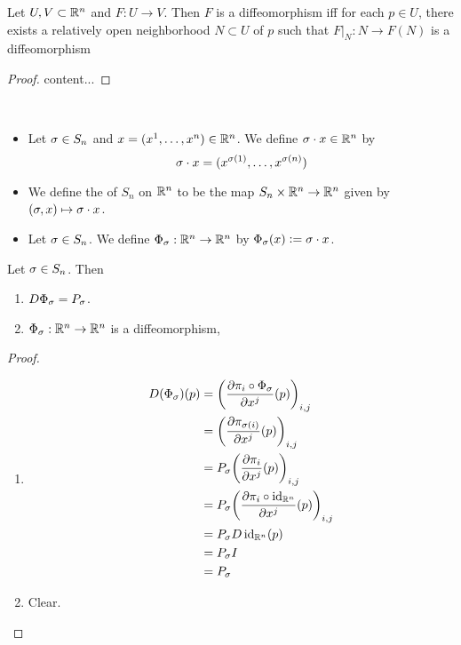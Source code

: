 \documentclass{book}
\begin{document}
	\begin{ex} 
		Let $U,V \subset \mathbb{R}^n$ and $F: U \rightarrow V$. Then $F$ is a diffeomorphism iff for each $p \in U$, there exists a relatively open neighborhood $N \subset U$ of $p$ such that $F|_N:N \rightarrow F(N)$ is a diffeomorphism
	\end{ex}
	
	\begin{proof}
		content... 
	\end{proof}
	
	\begin{defn}  \
		\begin{itemize}
			\item Let $\sigma \in S_n$ and $x = (x^1, \ldots, x^n) \in \mathbb{R}^n$. We define $\sigma \cdot x \in \mathbb{R}^n$ by 
			$$\sigma \cdot x = (x^{\sigma(1)}, \ldots, x^{\sigma(n)})$$
			\item We define the  of $S_n$ on $\mathbb{R}^n$ to be the map $S_n \times \mathbb{R}^n \rightarrow \mathbb{R}^n$ given by $(\sigma, x) \mapsto \sigma \cdot x$.
			\item Let $\sigma \in S_n$. We define $\Phi_{\sigma}: \mathbb{R}^n \rightarrow \mathbb{R}^n$ by $\Phi_{\sigma}(x) \vcentcolon= \sigma \cdot x$. 
		\end{itemize}
	\end{defn}
	
	\begin{ex} 
		Let $\sigma \in S_n$. Then 
		\begin{enumerate}
			\item $D \Phi_{\sigma} = P_{\sigma}$. 
			\item $\Phi_{\sigma}:\mathbb{R}^n \rightarrow \mathbb{R}^n$ is a diffeomorphism, 
		\end{enumerate}
	\end{ex}
	
	\begin{proof}\
		\begin{enumerate}
			\item 
			\begin{align*}
				D(\Phi_{\sigma})(p) 
				& = \bigg( \frac{\partial  \pi_{i} \circ \Phi_{\sigma}}{\partial x^j}(p) \bigg)_{i,j} \\
				& = \bigg( \frac{\partial \pi_{\sigma(i)}}{\partial x^j}(p) \bigg)_{i,j} \\
				& = P_{\sigma} \bigg( \frac{\partial \pi_{i}}{\partial x^j}(p) \bigg)_{i,j} \\
				& = P_{\sigma} \bigg( \frac{\partial \pi_{i} \circ \operatorname{id}_{\mathbb{R}^n} }{\partial x^j}(p) \bigg)_{i,j} \\
				& = P_{\sigma} D \operatorname{id}_{\mathbb{R}^n}(p) \\
				& = P_{\sigma} I \\
				& = P_{\sigma}
			\end{align*} 
			\item Clear.
		\end{enumerate}
	\end{proof}
	
\end{document}
